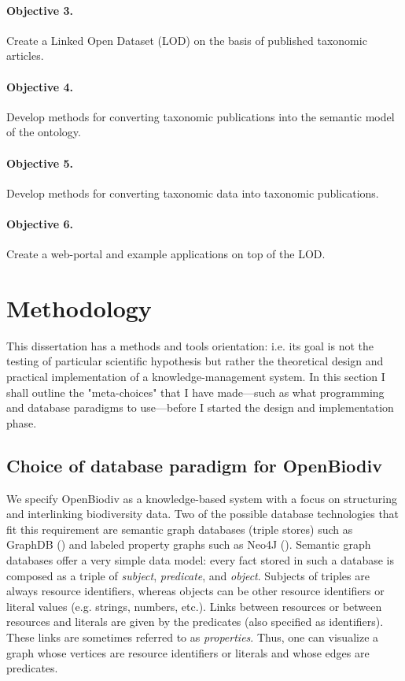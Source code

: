 \paragraph{Objective 3.} Create a Linked Open Dataset (LOD) on the basis of published taxonomic articles.
\paragraph{Objective 4.} Develop methods for converting taxonomic publications into the semantic model of the ontology.
\paragraph{Objective 5.} Develop methods for converting taxonomic data into taxonomic publications.
\paragraph{Objective 6.} Create a web-portal and example applications on top of the LOD.


\section*{Methodology}

This dissertation has a methods and tools orientation: i.e. its goal is not the testing of particular scientific hypothesis but rather the theoretical design and practical implementation of a knowledge-management system. In this section I shall outline the "meta-choices" that I have made---such as what programming and database paradigms to use---before I started the design and implementation phase. 

\subsection*{Choice of database paradigm for OpenBiodiv}

We specify OpenBiodiv as a knowledge-based system with a focus on structuring and interlinking biodiversity data. Two of the possible database technologies that fit this requirement are semantic graph databases (triple stores) such as GraphDB (\cite{ontotext_graphdb_2018}) and labeled property graphs such as Neo4J (\cite{neo4j_developers_neo4j_2012}).  Semantic graph databases offer a very simple data model: every fact stored in such a database is composed as a triple of \emph{subject}, \emph{predicate}, and \emph{object}. Subjects of triples are always resource identifiers, whereas objects can be other resource identifiers or literal values (e.g. strings, numbers, etc.).  Links between resources or between resources and literals are given by the predicates (also specified as identifiers). These links are sometimes referred to as \emph{properties}. Thus, one can visualize a graph whose vertices are resource identifiers or literals and whose edges are predicates.

